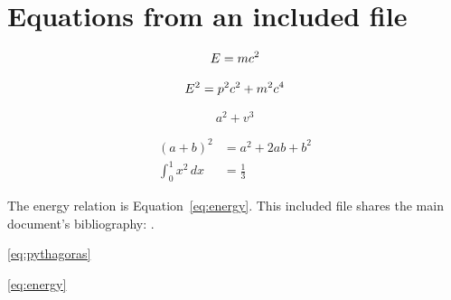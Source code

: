 %
%
%
\section{Equations from an included file}

\begin{equation*}
  E = mc^2
\end{equation*}

\begin{equation}
  E^2 = p^2c^2 + m^2c^4
  \label{eq:energy}
\end{equation}

\begin{equation}
  a^2 + v^3
  \label{eq:pythagoras}
\end{equation}

\begin{align*}
  (a+b)^2 &= a^2 + 2ab + b^2 \\
  \int_0^1 x^2\,dx &= \frac{1}{3}
\end{align*}

The energy relation is Equation~\ref{eq:energy}.
This included file shares the main document's bibliography: \cite{knuth1984texbook}.

\cite{knuth1984texbook} \ref{eq:pythagoras}

\ref{eq:energy}

